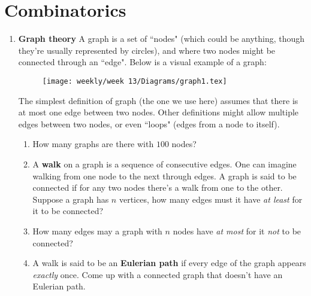 \documentclass[11pt]{scrartcl}
\begin{document}
\section{Combinatorics}
\begin{enumerate}[label=\textbf{C\arabic*}.]
    \item \textbf{Graph theory} \newline
    A graph is a set of ``nodes" (which could be anything, though they're usually represented by circles), and where two nodes might be connected through an ``edge". Below is a visual example of a graph:
    
    \begin{figure}[h]
        \centering
        \texttt{[image: weekly/week 13/Diagrams/graph1.tex]}
        \hspace{2em}
        \label{fig:graph1}
    \end{figure}
    The simplest definition of graph (the one we use here) assumes that there is at most one edge between two nodes. Other definitions might allow multiple edges between two nodes, or even ``loops" (edges from a node to itself).
    
    \begin{enumerate}
        \item How many graphs are there with $100$ nodes?
        \item A \textbf{walk} on a graph is a sequence of consecutive edges. One can imagine walking from one node to the next through edges. A graph is said to be connected if for any two nodes there's a walk from one to the other.\\
        Suppose a graph has $n$ vertices, how many edges must it have \emph{at least} for it to be connected?
        \item How many edges may a graph with $n$ nodes have \emph{at most} for it \emph{not} to be connected?
        \item A walk is said to be an \textbf{Eulerian path} if every edge of the graph appears \emph{exactly} once. Come up with a connected graph that doesn't have an Eulerian path.
    \end{enumerate}
    
\end{enumerate}

\newpage
\end{document}
